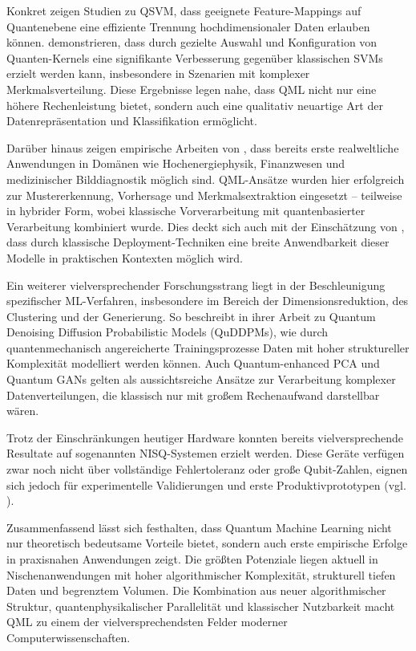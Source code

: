 Konkret zeigen Studien zu QSVM, dass geeignete Feature-Mappings auf Quantenebene eine effiziente Trennung hochdimensionaler Daten erlauben können. \cite{kavithaQuantumMachineLearning2024} demonstrieren, dass durch gezielte Auswahl und Konfiguration von Quanten-Kernels eine signifikante Verbesserung gegenüber klassischen SVMs erzielt werden kann, insbesondere in Szenarien mit komplexer Merkmalsverteilung. Diese Ergebnisse legen nahe, dass QML nicht nur eine höhere Rechenleistung bietet, sondern auch eine qualitativ neuartige Art der Datenrepräsentation und Klassifikation ermöglicht.

Darüber hinaus zeigen empirische Arbeiten von \cite{gujjuQuantumMachineLearning2024}, dass bereits erste realweltliche Anwendungen in Domänen wie Hochenergiephysik, Finanzwesen und medizinischer Bilddiagnostik möglich sind. QML-Ansätze wurden hier erfolgreich zur Mustererkennung, Vorhersage und Merkmalsextraktion eingesetzt – teilweise in hybrider Form, wobei klassische Vorverarbeitung mit quantenbasierter Verarbeitung kombiniert wurde. Dies deckt sich auch mit der Einschätzung von \cite{jerbiShadowsQuantumMachine2024}, dass durch klassische Deployment-Techniken eine breite Anwendbarkeit dieser Modelle in praktischen Kontexten möglich wird.

Ein weiterer vielversprechender Forschungsstrang liegt in der Beschleunigung spezifischer ML-Verfahren, insbesondere im Bereich der Dimensionsreduktion, des Clustering und der Generierung. So beschreibt \cite{zhuang_quantum_2024} in ihrer Arbeit zu Quantum Denoising Diffusion Probabilistic Models (QuDDPMs), wie durch quantenmechanisch angereicherte Trainingsprozesse Daten mit hoher struktureller Komplexität modelliert werden können. Auch Quantum-enhanced PCA und Quantum GANs gelten als aussichtsreiche Ansätze zur Verarbeitung komplexer Datenverteilungen, die klassisch nur mit großem Rechenaufwand darstellbar wären.

Trotz der Einschränkungen heutiger Hardware konnten bereits vielversprechende Resultate auf sogenannten NISQ-Systemen erzielt werden. Diese Geräte verfügen zwar noch nicht über vollständige Fehlertoleranz oder große Qubit-Zahlen, eignen sich jedoch für experimentelle Validierungen und erste Produktivprototypen (vgl. \cite{peral-garciaSystematicLiteratureReview2024, gujjuQuantumMachineLearning2024}).

Zusammenfassend lässt sich festhalten, dass Quantum Machine Learning nicht nur theoretisch bedeutsame Vorteile bietet, sondern auch erste empirische Erfolge in praxisnahen Anwendungen zeigt. Die größten Potenziale liegen aktuell in Nischenanwendungen mit hoher algorithmischer Komplexität, strukturell tiefen Daten und begrenztem Volumen. Die Kombination aus neuer algorithmischer Struktur, quantenphysikalischer Parallelität und klassischer Nutzbarkeit macht QML zu einem der vielversprechendsten Felder moderner Computerwissenschaften.


